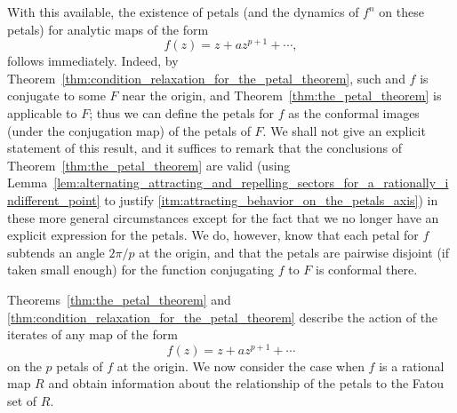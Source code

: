 \begin{remark}[First generalization of the Petal Theorem, still $R'(0) = 1$]
    With this available, the existence of petals (and the dynamics of $f^n$ on
    these petals) for analytic maps of the form
    \begin{equation*}
        f(z) = z + a z^{p+1} + \cdots,
    \end{equation*}
    follows immediately. Indeed, by
    Theorem~\ref{thm:condition_relaxation_for_the_petal_theorem}, such and $f$
    is conjugate to some $F$ near the origin, and
    Theorem~\ref{thm:the_petal_theorem} is applicable to $F$; thus we can define
    the petals for $f$ as the conformal images (under the conjugation map) of
    the petals of $F$. We shall not give an explicit statement of this result,
    and it suffices to remark that the conclusions of
    Theorem~\ref{thm:the_petal_theorem} are valid (using
    Lemma~\ref{lem:alternating_attracting_and_repelling_sectors_for_a_rationally_indifferent_point}
    to justify \ref{itm:attracting_behavior_on_the_petals_axis}) in these more
    general circumstances except for the fact that we no longer have an explicit
    expression for the petals. We do, however, know that each petal for $f$
    subtends an angle $2\pi/p$ at the origin, and that the petals are pairwise
    disjoint (if taken small enough) for the function conjugating $f$ to $F$ is
    conformal there.
\end{remark}

Theorems~\ref{thm:the_petal_theorem} and
\ref{thm:condition_relaxation_for_the_petal_theorem} describe the action of the
iterates of any map of the form
\begin{equation*}
    f(z) = z + az^{p+1} + \cdots
\end{equation*}
on the $p$ petals of $f$ at the origin. We now consider the case when $f$ is a
rational map $R$ and obtain information about the relationship of the petals to
the Fatou set of $R$.

